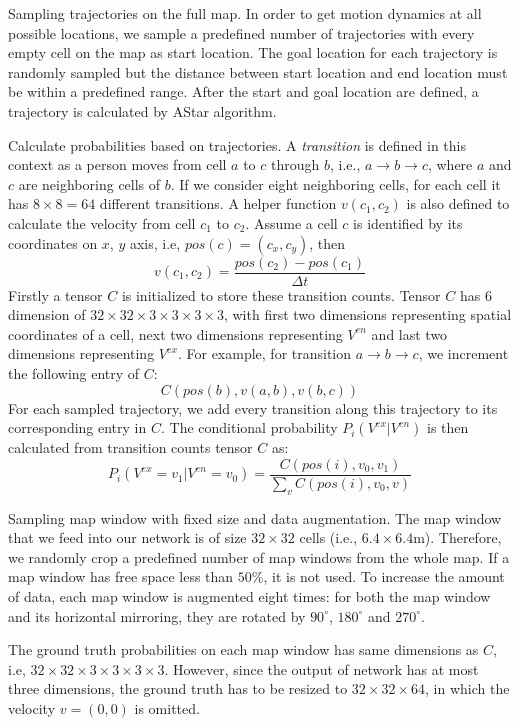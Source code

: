 \begin{my_enumerate}
\item Sampling trajectories on the full map. In order to get motion dynamics at all possible locations, we sample a predefined number of trajectories with every empty cell on the map as start location. The goal location for each trajectory is randomly sampled but the distance between start location and end location must be within a predefined range. After the start and goal location are defined, a trajectory is calculated by AStar algorithm.
\item Calculate probabilities based on trajectories. A \textit{transition} is defined in this context as a person moves from cell $a$ to $c$ through $b$, i.e., $a \rightarrow b \rightarrow c$, where $a$ and $c$ are neighboring cells of $b$. If we consider eight neighboring cells, for each cell it has $8\times8=64$ different transitions. A helper function $v(c_1,c_2)$ is also defined to calculate the velocity from cell $c_1$ to $c_2$. Assume a cell $c$ is identified by its coordinates on $x$, $y$ axis, i.e, $pos(c)=(c_x, c_y)$, then
\[v(c_1, c_2)=\frac{pos(c_2)-pos(c_1)}{\Delta t}\]
Firstly a tensor $C$ is initialized to store these transition counts. Tensor $C$ has 6 dimension of $32\times32\times3\times3\times3\times3$, with first two dimensions representing spatial coordinates of a cell, next two dimensions representing $V^{en}$ and last two dimensions representing $V^{ex}$. For example, for transition $a \rightarrow b \rightarrow c$, we increment the following entry of $C$:
\[ C(pos(b), v(a, b), v(b, c))\]
For each sampled trajectory, we add every transition along this trajectory to its corresponding entry in $C$. The conditional probability $P_i(V^{ex}|V^{en})$ is then calculated from transition counts tensor $C$ as:
\begin{equation}
P_i(V^{ex}=v_1|V^{en}=v_0) = \frac{C(pos(i), v_0, v_1)}{\sum_{ v}C(pos(i), v_0, v)}
\end{equation}
\item Sampling map window with fixed size and data augmentation. The map window that we feed into our network is of size $32\times32$ cells (i.e., $6.4 \times 6.4$m). Therefore, we randomly crop a predefined number of map windows from the whole map. If a map window has free space less than $50\%$, it is not used. To increase the amount of data, each map window is augmented eight times: for both the map window and its horizontal mirroring, they are rotated by $90^\circ$, $180^\circ$ and $270^\circ$. 

The ground truth probabilities on each map window has same dimensions as $C$, i.e, $32\times32\times3\times3\times3\times3$. However, since the output of network has at most three dimensions, the ground truth has to be resized to $32\times32\times64$, in which the velocity $v=(0, 0)$ is omitted.
\end{my_enumerate}

